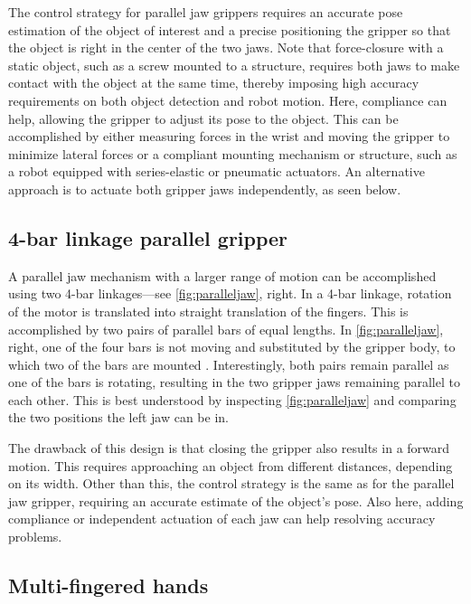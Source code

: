 The control strategy for parallel jaw grippers requires an accurate pose estimation of the object of interest and a precise positioning the gripper so that the object is right in the center of the two jaws. Note that force-closure with a static object, such as a screw mounted to a structure, requires both jaws to make contact with the object at the same time, thereby imposing high accuracy requirements on both object detection and robot motion. Here, compliance can help, allowing the gripper to adjust its pose to the object. This can be accomplished by either measuring forces in the wrist and moving the gripper to minimize lateral forces or a compliant mounting mechanism or structure, such as a robot equipped with series-elastic or pneumatic actuators. An alternative approach is to actuate both gripper jaws independently, as seen below.

\subsection{4-bar linkage parallel gripper}

A parallel jaw mechanism with a larger range of motion can be accomplished using two 4-bar linkages---see \cref{fig:paralleljaw}, right. In a 4-bar linkage, rotation of the motor is translated into straight translation of the fingers. This is accomplished by two pairs of parallel bars of equal lengths. In \cref{fig:paralleljaw}, right, one of the four bars is not moving and substituted by the gripper body, to which two of the bars are mounted . Interestingly, both pairs remain parallel as one of the bars is rotating, resulting in the two gripper jaws remaining parallel to each other. This is best understood by inspecting \cref{fig:paralleljaw} and comparing the two positions the left jaw can be in.

The drawback of this design is that closing the gripper also results in a forward motion. This requires approaching an object from different distances, depending on its width. Other than this, the control strategy is the same as for the parallel jaw gripper, requiring an accurate estimate of the object's pose. Also here, adding compliance or independent actuation of each jaw can help resolving accuracy problems.

\subsection{Multi-fingered hands}

